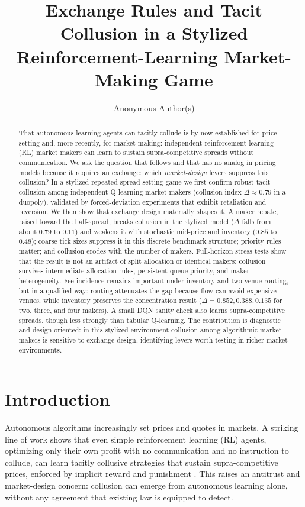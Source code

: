 \documentclass[sigconf]{acmart}
\title{Exchange Rules and Tacit Collusion in a Stylized Reinforcement-Learning Market-Making Game}
\author{Anonymous Author(s)}
\date{}
\begin{document}
\begin{abstract}
That autonomous learning agents can tacitly collude is by now established for price setting and, more recently, for market making: independent reinforcement learning (RL) market makers can learn to sustain supra-competitive spreads without communication. We ask the question that follows and that has no analog in pricing models because it requires an exchange: which \emph{market-design} levers suppress this collusion? In a stylized repeated spread-setting game we first confirm robust tacit collusion among independent Q-learning market makers (collusion index $\Delta \approx 0.79$ in a duopoly), validated by forced-deviation experiments that exhibit retaliation and reversion. We then show that exchange design materially shapes it. A maker rebate, raised toward the half-spread, breaks collusion in the stylized model ($\Delta$ falls from about $0.79$ to $0.11$) and weakens it with stochastic mid-price and inventory ($0.85$ to $0.48$); coarse tick sizes suppress it in this discrete benchmark structure; priority rules matter; and collusion erodes with the number of makers. Full-horizon stress tests show that the result is not an artifact of split allocation or identical makers: collusion survives intermediate allocation rules, persistent queue priority, and maker heterogeneity. Fee incidence remains important under inventory and two-venue routing, but in a qualified way: routing attenuates the gap because flow can avoid expensive venues, while inventory preserves the concentration result ($\Delta=0.852,0.388,0.135$ for two, three, and four makers). A small DQN sanity check also learns supra-competitive spreads, though less strongly than tabular Q-learning. The contribution is diagnostic and design-oriented: in this stylized environment collusion among algorithmic market makers is sensitive to exchange design, identifying levers worth testing in richer market environments.
\end{abstract}

\maketitle

\section{Introduction}

Autonomous algorithms increasingly set prices and quotes in markets. A striking line of work shows that even simple reinforcement learning (RL) agents, optimizing only their own profit with no communication and no instruction to collude, can learn tacitly collusive strategies that sustain supra-competitive prices, enforced by implicit reward and punishment \cite{calvano2020}. This raises an antitrust and market-design concern: collusion can emerge from autonomous learning alone, without any agreement that existing law is equipped to detect.
\end{document}
